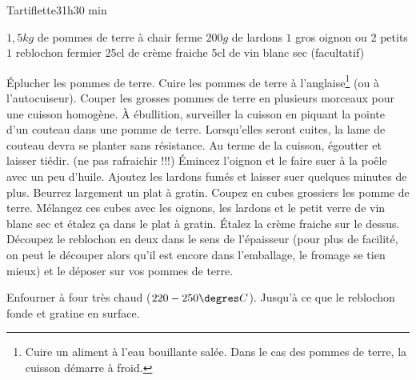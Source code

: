 \begin{recette}{Tartiflette}{3}{1h}{30 min}

\begin{ingredients}
\ingredient $1,5\unit{kg}$ de pommes de terre à chair ferme
\ingredient $200\unit{g}$ de lardons
\ingredient $1$ gros oignon ou 2 petits
\ingredient $1$ reblochon fermier
\ingredient 25cl de crème fraiche
\ingredient 5cl de vin blanc sec (facultatif)
\end{ingredients}

\begin{preparation}
\etape Éplucher les pommes de terre. Cuire les pommes de terre à l'anglaise\footnote{Cuire un aliment à l'eau bouillante salée. Dans le cas des pommes de terre, la cuisson démarre à froid.} (ou à l'autocuiseur). Couper les grosses pommes de terre en plusieurs morceaux pour une cuisson homogène.
\etape À ébullition, surveiller la cuisson en piquant la pointe d'un couteau dans une pomme de terre. Lorsqu'elles seront cuites, la lame de couteau devra se planter sans résistance.
\etape Au terme de la cuisson, égoutter et laisser tiédir. (ne pas rafraichir !!!)
\etape Émincez l'oignon et le faire suer à la poêle avec un peu d'huile.
\etape Ajoutez les lardons fumés et laisser suer quelques minutes de plus.
\etape Beurrez largement un plat à gratin.
\etape Coupez en cubes grossiers les pomme de terre. Mélangez ces cubes avec les oignons, les lardons et le petit verre de vin blanc sec et étalez ça dans le plat à gratin. 
\etape Étalez la crème fraiche sur le dessus.
\etape Découpez le reblochon en deux dans le sens de l'épaisseur (pour plus de facilité, on peut le découper alors qu'il est encore dans l'emballage, le fromage se tien mieux) et le déposer sur vos pommes de terre.
\end{preparation}

\begin{cuisson}
Enfourner à four très chaud ($220-250\degres C$). Jusqu'à ce que le reblochon fonde et gratine en surface.
\end{cuisson}
\end{recette}

